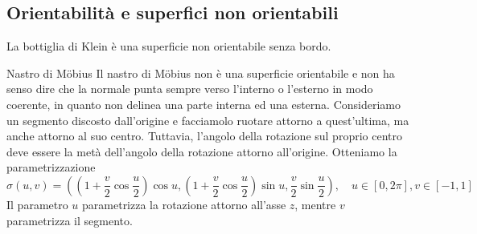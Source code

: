\documentclass[a4paper]{article}
\begin{document}
\subsection{Orientabilità e superfici non orientabili}

\begin{radioactive}
La bottiglia di Klein è una superficie non orientabile senza bordo.
\end{radioactive}

\begin{radioactive}
\begin{snippetexample}{Nastro di Möbius}
    Il nastro di Möbius non è una superficie orientabile e non ha senso dire che la normale punta sempre
    verso l'interno o l'esterno in modo coerente, in quanto non delinea una parte interna ed una esterna.
    Consideriamo un segmento discosto dall'origine e facciamolo ruotare attorno a quest'ultima,
    ma anche attorno al suo centro. Tuttavia, l'angolo della rotazione sul proprio centro deve essere la metà
    dell'angolo della rotazione attorno all'origine. Otteniamo la parametrizzazione
    \[
        \sigma(u,v) = \left(
            \left(1 + \frac v2 \cos \frac u2\right)\cos u,
            \left(1 + \frac v2 \cos \frac u2\right)\sin u,
            \frac v2 \sin \frac u2
        \right), \quad u \in [0,2\pi], v \in [-1,1]
    \]
    Il parametro \(u\) parametrizza la rotazione attorno all'asse \(z\),
    mentre \(v\) parametrizza il segmento.
    \begin{center}
\end{center}
\end{snippetexample}
\end{radioactive}
\end{document}
